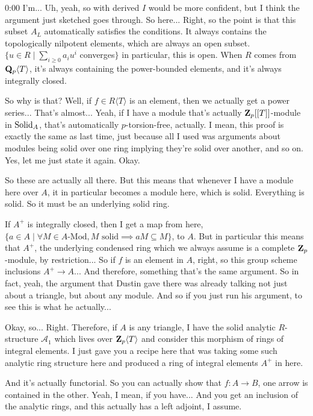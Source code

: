 \begin{unfinished}{0:00}
I'm... Uh, yeah, so with derived $I$ would be more confident, but I think the argument just sketched goes through. So here... Right, so the point is that this subset $A_L$ automatically satisfies the conditions. It always contains the topologically nilpotent elements, which are always an open subset. $\{u\in R\mid \sum_{i\geq 0} a_i u^i$ converges$\}$ in particular, this is open. When $R$ comes from $\mathbf Q_p\langle T \rangle$, it's always containing the power-bounded elements, and it's always integrally closed.

So why is that? Well, if $f\in R\langle T \rangle$ is an element, then we actually get a power series... That's almost... Yeah, if I have a module that's actually $\mathbf Z_p[[T]]$-module in $\mathrm{Solid}_A$, that's automatically $p$-torsion-free, actually. I mean, this proof is exactly the same as last time, just because all I used was arguments about modules being solid over one ring implying they're solid over another, and so on. Yes, let me just state it again. Okay.

So these are actually all there. But this means that whenever I have a module here over $A$, it in particular becomes a module here, which is solid. Everything is solid. So it must be an underlying solid ring.

If $A^+$ is integrally closed, then I get a map from here, $\{a\in A\mid \forall M\in A\text{-}\mathrm{Mod}, M \text{ solid} \implies aM \subseteq M\}$, to $A$. But in particular this means that $A^+$, the underlying condensed ring which we always assume is a complete $\mathbf Z_p$-module, by restriction... So if $f$ is an element in $A$, right, so this group scheme inclusions $A^+\to A$... And therefore, something that's the same argument. So in fact, yeah, the argument that Dustin gave there was already talking not just about a triangle, but about any module. And so if you just run his argument, to see this is what he actually...

Okay, so... Right. Therefore, if $A$ is any triangle, I have the solid analytic $R$-structure $\mathcal{A}_1$ which lives over $\mathbf Z_p\langle T \rangle$ and consider this morphism of rings of integral elements. I just gave you a recipe here that was taking some such analytic ring structure here and produced a ring of integral elements $A^+$ in here.

And it's actually functorial. So you can actually show that $f:A\to B$, one arrow is contained in the other. Yeah, I mean, if you have... And you get an inclusion of the analytic rings, and this actually has a left adjoint, I assume.


\end{unfinished}
